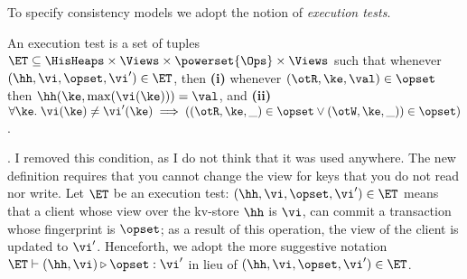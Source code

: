 To specify consistency models we adopt the notion of \emph{execution tests}. 
\begin{definition}
\label{def:execution.test}
An execution test is a set of tuples $\ET \subseteq \HisHeaps \times \Views \times \powerset{\Ops} \times \Views$ 
such that whenever $(\hh, \vi, \opset, \vi') \in \ET$, then 
\textbf{(i)} whenever $(\otR, \ke, \val) \in \opset$ then $\hh(\ke, \max(\vi(\ke))) = \val$, 
and \textbf{(ii)}  $\forall \ke. \; \vi(\ke) \neq \vi'(\ke) \implies ( (\otR, \ke, \_) \in \opset \vee (\otW, \ke, \_)) \in \opset)$.
\end{definition}
.
\ac{I removed this condition, as I do not think that it was used anywhere. The new definition requires that 
you cannot change the view for keys that you do not read nor write.}
Let $\ET$ be an execution test: $(\hh, \vi, \opset, \vi') \in \ET$ means 
that a client whose view over the kv-store $\hh$ is $\vi$, can commit a 
transaction whose fingerprint is $\opset$; as a result of this operation, the 
view of the client is updated to $\vi'$. Henceforth, we adopt the 
more suggestive notation $\ET \vdash (\hh, \vi) \triangleright \opset: \vi'$ 
in lieu of $(\hh, \vi, \opset, \vi') \in \ET$.
